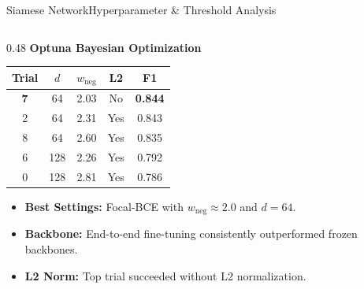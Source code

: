 \documentclass[10pt]{beamer}
\begin{document}
\begin{frame}{Siamese Network}{Hyperparameter \& Threshold Analysis}
\begin{columns}[T]
        \vrule{}

        \begin{column}{0.48\textwidth}
            \centering
            \textbf{Optuna Bayesian Optimization}
            \vspace{0.2cm}
            \begin{table}
                \scriptsize
                \centering
                \begin{tabular}{ccccc}
                    \toprule
                    Trial & $d$ & $w_{\text{neg}}$ & L2 & F1 \\
                    \midrule
                    \textbf{7} & 64 & 2.03 & No & \textbf{0.844} \\
                    2 & 64 & 2.31 & Yes & 0.843 \\
                    8 & 64 & 2.60 & Yes & 0.835 \\
                    6 & 128 & 2.26 & Yes & 0.792 \\
                    0 & 128 & 2.81 & Yes & 0.786 \\
                    \bottomrule
                \end{tabular}
            \end{table}
            \begin{itemize}
                \tiny
                \item \textbf{Best Settings:} Focal-BCE with $w_{\text{neg}} \approx 2.0$ and $d=64$.
                \item \textbf{Backbone:} End-to-end fine-tuning consistently outperformed frozen backbones.
                \item \textbf{L2 Norm:} Top trial succeeded without L2 normalization.
            \end{itemize}
        \end{column}
    \end{columns}
\end{frame}
\end{document}
